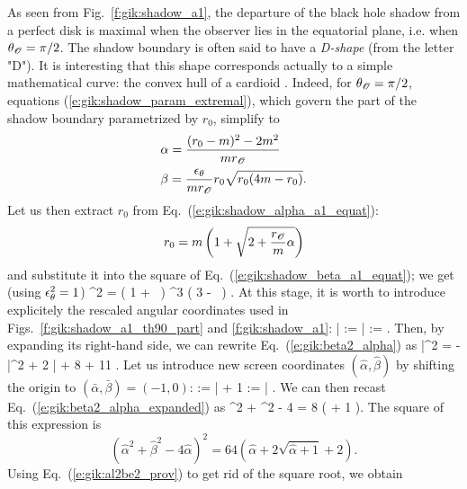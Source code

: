 As seen from Fig.~\ref{f:gik:shadow_a1}, the departure of the black hole
shadow from a perfect disk is maximal when the observer lies in the equatorial
plane, i.e. when $\theta_{\mathscr{O}} = \pi/2$. The shadow boundary is often said to have
a \emph{D-shape} (from the letter "D"). It is interesting that this shape
corresponds actually to a simple mathematical curve: the convex hull of a
cardioid \cite{FarahPJB20}.
Indeed, for $\theta_{\mathscr{O}} = \pi/2$, equations (\ref{e:gik:shadow_param_extremal}),
which govern the part of the shadow boundary parametrized by $r_0$,
simplify to
\begin{subequations}
\begin{align}
    & \alpha = \frac{(r_0 - m)^2 - 2 m^2}{m r_{\mathscr{O}}} \label{e:gik:shadow_alpha_a1_equat} \\
    & \beta = \frac{\epsilon_\theta}{m r_{\mathscr{O}}} r_0 \sqrt{r_0(4 m - r_0)} . \label{e:gik:shadow_beta_a1_equat}
\end{align}
\end{subequations}
Let us then extract $r_0$ from Eq.~(\ref{e:gik:shadow_alpha_a1_equat}):
\[
    r_0 = m \left( 1 + \sqrt{2 + \frac{r_{\mathscr{O}}}{m}\alpha} \right)
\]
and substitute it into the square of Eq.~(\ref{e:gik:shadow_beta_a1_equat}); we get (using $\epsilon_\theta^2 = 1$)
\be \label{e:gik:beta2_alpha}
    \beta^2 =  \left( 1 + \,  \right) ^3
    \left( 3 -   \, \right) .
\ee
At this stage, it is worth to introduce explicitely the rescaled angular coordinates used
in Figs.~\ref{f:gik:shadow_a1_th90_part} and \ref{f:gik:shadow_a1}:
\be \label{e:gik:def_bar_alp_bet}
    \bar{\alpha} :=  \alpha \qand
    \bar{\beta} :=  \beta .
\ee
Then, by expanding its right-hand side, we can rewrite Eq.~(\ref{e:gik:beta2_alpha}) as
\be \label{e:gik:beta2_alpha_expanded}
    \bar{\beta}^2 = - \bar{\alpha}^2 + 2 \bar{\alpha} + 8  + 11 .
\ee
Let us introduce new screen coordinates $(\hat{\alpha}, \hat{\beta})$ by
shifting the origin to $(\bar{\alpha},\bar{\beta}) = (-1, 0)$:
\be
    \hat{\alpha} := \bar{\alpha} + 1  \qand
    \hat{\beta} := \bar{\beta} .
\ee
We can then recast Eq.~(\ref{e:gik:beta2_alpha_expanded}) as
\be \label{e:gik:al2be2_prov}
    \hat{\alpha}^2 + \hat{\beta}^2 - 4 \hat{\alpha} = 8 \left(  + 1 \right).
\ee
The square of this expression is
\[
   \left( \hat{\alpha}^2 + \hat{\beta}^2  - 4 \hat{\alpha} \right)^2 =
    64 \left( \hat{\alpha} + 2 \sqrt{\hat{\alpha} + 1} + 2 \right) .
\]
Using Eq.~(\ref{e:gik:al2be2_prov}) to get rid of the square root, we obtain
